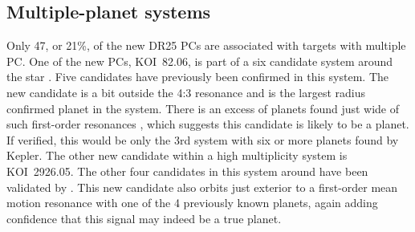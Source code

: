 \subsection{Multiple-planet systems}
Only 47, or 21\%, of the new DR25 PCs are associated with targets with multiple PC. One of the new PCs, KOI~82.06, is part of a six candidate system around the star . Five candidates have previously been confirmed \citep{Marcy2014,Rowe2014} in this system. The new candidate is a bit outside the 4:3 resonance and is the largest radius confirmed planet in the system. There is an excess of planets found just wide of such first-order resonances \citep{Lissauer2011}, which suggests this candidate is likely to be a planet. If verified, this would be only the 3rd system with six or more planets found by Kepler. 
The other new candidate within a high multiplicity system is KOI~2926.05. The other four candidates in this system around  have been validated by \citet{Morton2016}. This new candidate also orbits just exterior to a first-order mean motion resonance with one of the 4 previously known planets, again adding confidence that this signal may indeed be a true planet.

